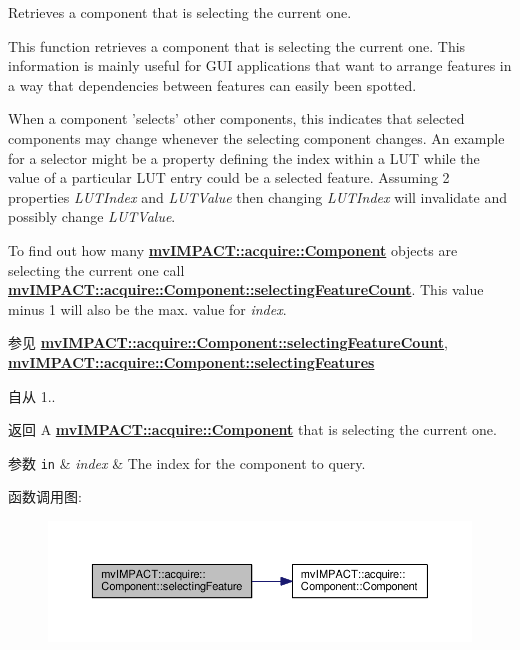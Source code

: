 Retrieves a component that is selecting the current one. 

This function retrieves a component that is selecting the current one. This information is mainly useful for G\+U\+I applications that want to arrange features in a way that dependencies between features can easily been spotted.

When a component 'selects' other components, this indicates that selected components may change whenever the selecting component changes. An example for a selector might be a property defining the index within a L\+U\+T while the value of a particular L\+U\+T entry could be a selected feature. Assuming 2 properties {\itshape L\+U\+T\+Index} and {\itshape L\+U\+T\+Value} then changing {\itshape L\+U\+T\+Index} will invalidate and possibly change {\itshape L\+U\+T\+Value}.

To find out how many {\bfseries \hyperlink{classmv_i_m_p_a_c_t_1_1acquire_1_1_component}{mv\+I\+M\+P\+A\+C\+T\+::acquire\+::\+Component}} objects are selecting the current one call {\bfseries \hyperlink{classmv_i_m_p_a_c_t_1_1acquire_1_1_component_abca6187054b1eefdabd8822c5d889320}{mv\+I\+M\+P\+A\+C\+T\+::acquire\+::\+Component\+::selecting\+Feature\+Count}}. This value minus 1 will also be the max. value for {\itshape index}. \begin{DoxySeeAlso}{参见}
{\bfseries \hyperlink{classmv_i_m_p_a_c_t_1_1acquire_1_1_component_abca6187054b1eefdabd8822c5d889320}{mv\+I\+M\+P\+A\+C\+T\+::acquire\+::\+Component\+::selecting\+Feature\+Count}}, ~\newline
{\bfseries \hyperlink{classmv_i_m_p_a_c_t_1_1acquire_1_1_component_ad57072c7362fdf4e714cab1f06f2574c}{mv\+I\+M\+P\+A\+C\+T\+::acquire\+::\+Component\+::selecting\+Features}} 
\end{DoxySeeAlso}
\begin{DoxySince}{自从}
1..
\end{DoxySince}
\begin{DoxyReturn}{返回}
A {\bfseries \hyperlink{classmv_i_m_p_a_c_t_1_1acquire_1_1_component}{mv\+I\+M\+P\+A\+C\+T\+::acquire\+::\+Component}} that is selecting the current one. 
\end{DoxyReturn}

\begin{DoxyParams}[1]{参数}
\mbox{\tt in}  & {\em index} & The index for the component to query. \\
\hline
\end{DoxyParams}


函数调用图\+:
\nopagebreak
\begin{figure}[H]
\begin{center}
\leavevmode
\includegraphics[width=350pt]{classmv_i_m_p_a_c_t_1_1acquire_1_1_component_ad8a74647397e051683b301cb92d86e9f_cgraph}
\end{center}
\end{figure}


